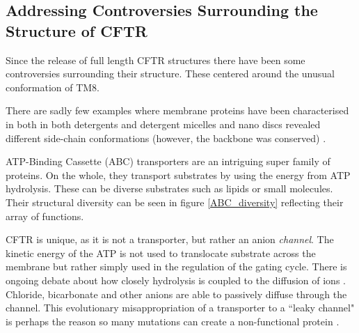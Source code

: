 \subsection{Addressing Controversies Surrounding the Structure of CFTR}

Since the release of full length CFTR structures there have been some controversies surrounding their structure. These centered around the unusual conformation of TM8.

There are sadly few examples where membrane proteins have been characterised in both in both detergents and detergent micelles and nano discs revealed different side-chain conformations (however, the backbone was conserved) \cite{autzen2019, gao2016, cheng2015}. 



ATP-Binding Cassette (ABC) transporters are an intriguing super family of proteins. On the whole, they transport substrates by using the energy from ATP hydrolysis. These can be diverse substrates such as lipids or small molecules. Their structural diversity can be seen in figure \ref{ABC_diversity} reflecting their array of functions. 

CFTR is unique, as it is not a transporter, but rather an anion \textit{channel}. The kinetic energy of the ATP is not used to translocate substrate across the membrane but rather simply used in the regulation of the gating cycle. There is ongoing debate about how closely hydrolysis is coupled to the diffusion of ions \cite{}. Chloride, bicarbonate and other anions are able to passively diffuse through the channel. This evolutionary misappropriation of a transporter to a ``leaky channel" is perhaps the reason so many mutations can create a non-functional protein \cite{depristo2005,linsdell2018}.

